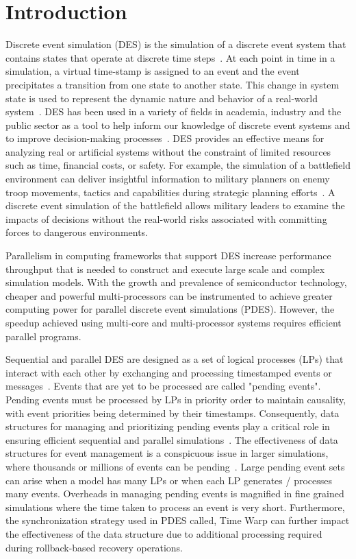 \chapter{Introduction} 
	Discrete event simulation (DES) is the simulation of a discrete event system that contains states that operate at discrete time steps~\cite{fishman-13}. At each point in time in a simulation, a virtual time-stamp is assigned to an event and the event precipitates a transition from one state to another state. This change in system state is used to represent the dynamic nature and behavior of a real-world system~\cite{fujimoto-90}. DES has been used in a variety of fields in academia, industry and the public sector as a tool to help inform our knowledge of discrete event systems and to improve decision-making processes~\cite{fishman-13}. DES provides an effective means for analyzing real or artificial systems without the constraint of limited resources such as time, financial costs, or safety. For example, the simulation of a battlefield environment can deliver insightful information to military planners on enemy troop movements, tactics and capabilities during strategic planning efforts~\cite{hill-01}. A discrete event simulation of the battlefield allows military leaders to examine the impacts of decisions without the real-world risks associated with committing forces to dangerous environments. 
    
	Parallelism in computing frameworks that support DES increase performance throughput that is needed to construct and execute large scale and complex simulation models. With the growth and prevalence of semiconductor technology, cheaper and powerful multi-processors can be instrumented to achieve greater computing power for parallel discrete event simulations (PDES). However, the speedup achieved using multi-core and multi-processor systems requires efficient parallel programs. 
    
    Sequential and parallel DES are designed as a set of logical processes (LPs) that interact with each other by exchanging and processing timestamped events or messages~\cite{jafer-13}. Events that are yet to be processed are called "pending events". Pending events must be processed by LPs in priority order to maintain causality, with event priorities being determined by their timestamps. Consequently, data structures for managing and prioritizing pending events play a critical role in ensuring efficient sequential and parallel simulations~\cite{jones-86,ronngren-97,brown-88,franceschini-15}. The effectiveness of data structures for event management is a conspicuous issue in larger simulations, where thousands or millions of events can be pending~\cite{carothers-2010,yeom-14}. Large pending event sets can arise when a model has many LPs or when each LP generates / processes many events. Overheads in managing pending events is magnified in fine grained simulations where the time taken to process an event is very short. Furthermore, the synchronization strategy used in PDES called, Time Warp can further impact the effectiveness of the data structure due to additional processing required during rollback-based recovery operations.

